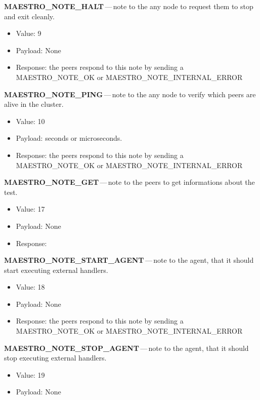 \begin{description}
\begin{itemize}
  \end{itemize}
  \item \textbf{MAESTRO\_NOTE\_HALT}\,---\,note to the any node to request them to stop and exit cleanly.
  \begin{itemize}
    \setlength\itemsep{0em}
    \item Value: 9
    \item Payload: None
    \item Response: the peers respond to this note by sending a MAESTRO\_NOTE\_OK or MAESTRO\_NOTE\_INTERNAL\_ERROR
  \end{itemize}
  \item \textbf{MAESTRO\_NOTE\_PING}\,---\,note to the any node to verify which peers are alive in the cluster.
  \begin{itemize}
    \setlength\itemsep{0em}
    \item Value: 10
    \item Payload: seconds or microseconds.
    \item Response: the peers respond to this note by sending a MAESTRO\_NOTE\_OK or MAESTRO\_NOTE\_INTERNAL\_ERROR
  \end{itemize}
  \item \textbf{MAESTRO\_NOTE\_GET}\,---\,note to the peers to get informations about the test.
  \begin{itemize}
    \setlength\itemsep{0em}
    \item Value: 17
    \item Payload: None
    \item Response:
  \end{itemize}
  \item \textbf{MAESTRO\_NOTE\_START\_AGENT}\,---\,note to the agent, that it should start executing external handlers.
  \begin{itemize}
    \setlength\itemsep{0em}
    \item Value: 18
    \item Payload: None
    \item Response: the peers respond to this note by sending a MAESTRO\_NOTE\_OK or MAESTRO\_NOTE\_INTERNAL\_ERROR
  \end{itemize}
  \item \textbf{MAESTRO\_NOTE\_STOP\_AGENT}\,---\,note to the agent, that it should stop executing external handlers.
  \begin{itemize}
    \setlength\itemsep{0em}
    \item Value: 19
    \item Payload: None

\end{itemize}
\end{description}
